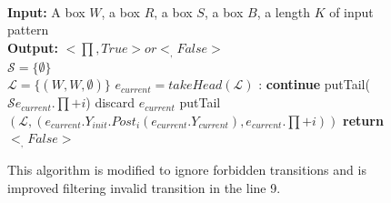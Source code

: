       \begin{figure}
        \begin{algorithmic}[1]
           \\
            \textbf{Input:} A box $W$, a box $R$,
            a box $S$, a box $B$, a length $K$ of input pattern\\
            \textbf{Output:} $<\prod,True> or <_,False>$ \\
            $\mathcal{S}= \lbrace \emptyset \rbrace$ \\
            $\mathcal{L}= \lbrace (W,W,\emptyset) \rbrace$
              \State $e_{current} = takeHead(\mathcal{L})$
              :
                  \State \textbf{continue}
                \EndIf
                \label{alg:filter_transitions}
                  \State putTail($\mathcal{S}e_{current}.\prod + i$)
                \Else
                    \State discard $e_{current}$
                  \EndIf
                      \State putTail$(\mathcal{L},(e_{current}.Y_{init}.Post_{i}(e_{current}.Y_{current}),e_{current}.\prod+i))$
                    \EndIf              
                  \EndIf
                \EndIf
              \EndFor          
            \EndWhile
            \State \textbf{return} $<_,False>$ 
          \EndProcedure    
        \end{algorithmic}
        \captionsetup{format=hang}
        \caption{This algorithm is modified to ignore forbidden transitions  
        and is improved filtering invalid transition in the line 9.}
      \end{figure}                  
      \clearpage


